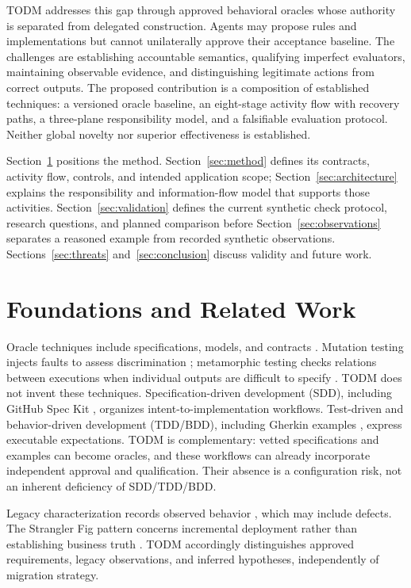\documentclass[11pt,a4paper]{article}
\newcommand{\todm}{\textsc{TODM}}
\begin{document}
\todm{} addresses this gap through approved behavioral oracles whose authority is separated from delegated construction. Agents may propose rules and implementations but cannot unilaterally approve their acceptance baseline. The challenges are establishing accountable semantics, qualifying imperfect evaluators, maintaining observable evidence, and distinguishing legitimate actions from correct outputs. The proposed contribution is a composition of established techniques: a versioned oracle baseline, an eight-stage activity flow with recovery paths, a three-plane responsibility model, and a falsifiable evaluation protocol. Neither global novelty nor superior effectiveness is established.

Section~\ref{sec:foundations} positions the method. Section~\ref{sec:method} defines its contracts, activity flow, controls, and intended application scope; Section~\ref{sec:architecture} explains the responsibility and information-flow model that supports those activities. Section~\ref{sec:validation} defines the current synthetic check protocol, research questions, and planned comparison before Section~\ref{sec:observations} separates a reasoned example from recorded synthetic observations. Sections~\ref{sec:threats} and~\ref{sec:conclusion} discuss validity and future work.

\section{Foundations and Related Work}\label{sec:foundations}
Oracle techniques include specifications, models, and contracts \cite{barr2015oracle}. Mutation testing injects faults to assess discrimination \cite{jia2011mutation}; metamorphic testing checks relations between executions when individual outputs are difficult to specify \cite{segura2016metamorphic}. TODM does not invent these techniques. Specification-driven development (SDD), including GitHub Spec Kit \cite{github2026speckit}, organizes intent-to-implementation workflows. Test-driven and behavior-driven development (TDD/BDD), including Gherkin examples \cite{cucumber2026}, express executable expectations. TODM is complementary: vetted specifications and examples can become oracles, and these workflows can already incorporate independent approval and qualification. Their absence is a configuration risk, not an inherent deficiency of SDD/TDD/BDD.

Legacy characterization records observed behavior \cite{feathers2004legacy}, which may include defects. The Strangler Fig pattern concerns incremental deployment rather than establishing business truth \cite{fowler2004strangler}. TODM accordingly distinguishes approved requirements, legacy observations, and inferred hypotheses, independently of migration strategy.
\end{document}
